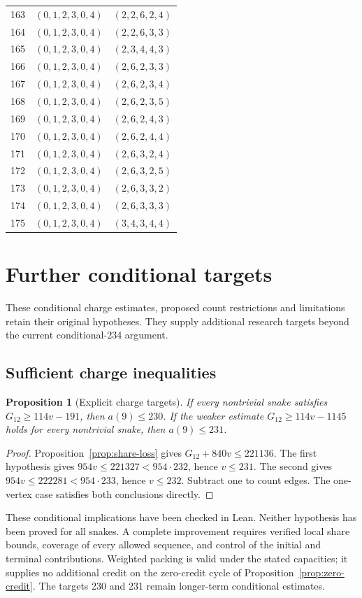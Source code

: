 \documentclass[11pt,a4paper]{article}
\newtheorem{proposition}[theorem]{Proposition}
\theoremstyle{definition}
\theoremstyle{remark}
\begin{document}
\begin{longtable}{rll}
163 & $(0,1,2,3,0,4)$ & $(2,2,6,2,4)$\\
164 & $(0,1,2,3,0,4)$ & $(2,2,6,3,3)$\\
165 & $(0,1,2,3,0,4)$ & $(2,3,4,4,3)$\\
166 & $(0,1,2,3,0,4)$ & $(2,6,2,3,3)$\\
167 & $(0,1,2,3,0,4)$ & $(2,6,2,3,4)$\\
168 & $(0,1,2,3,0,4)$ & $(2,6,2,3,5)$\\
169 & $(0,1,2,3,0,4)$ & $(2,6,2,4,3)$\\
170 & $(0,1,2,3,0,4)$ & $(2,6,2,4,4)$\\
171 & $(0,1,2,3,0,4)$ & $(2,6,3,2,4)$\\
172 & $(0,1,2,3,0,4)$ & $(2,6,3,2,5)$\\
173 & $(0,1,2,3,0,4)$ & $(2,6,3,3,2)$\\
174 & $(0,1,2,3,0,4)$ & $(2,6,3,3,3)$\\
175 & $(0,1,2,3,0,4)$ & $(3,4,3,4,4)$\\
\end{longtable}

\section{Further conditional targets}\label{app:research-targets}
These conditional charge estimates, proposed count restrictions and
limitations retain their original hypotheses. They supply additional
research targets beyond the current conditional-234 argument.

\subsection{Sufficient charge inequalities}
\begin{proposition}[Explicit charge targets]\label{prop:charge-targets}
If every nontrivial snake satisfies $G_{12}\ge114v-191$, then $a(9)\le230$. If the weaker estimate $G_{12}\ge114v-1145$ holds for every nontrivial snake, then $a(9)\le231$.
\end{proposition}
\begin{proof}
Proposition~\ref{prop:share-loss} gives $G_{12}+840v\le221136$. The first hypothesis gives $954v\le221327<954\cdot232$, hence $v\le231$. The second gives $954v\le222281<954\cdot233$, hence $v\le232$. Subtract one to count edges. The one-vertex case satisfies both conclusions directly.
\end{proof}
These conditional implications have been checked in Lean. Neither hypothesis has been proved for all snakes. A complete improvement requires verified local share bounds, coverage of every allowed sequence, and control of the initial and terminal contributions. Weighted packing is valid under the stated capacities; it supplies no additional credit on the zero-credit cycle of Proposition~\ref{prop:zero-credit}. The targets 230 and 231 remain longer-term conditional estimates.
\end{document}
